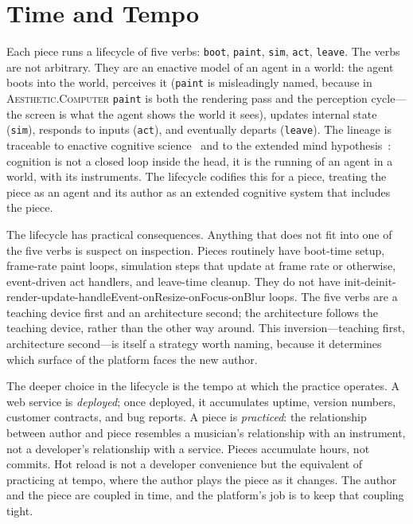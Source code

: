 \documentclass[10pt,letterpaper,twocolumn]{article}
\newcommand{\ac}{\textsc{Aesthetic.Computer}}
\begin{document}
\section{Time and Tempo}

Each piece runs a lifecycle of five verbs: \texttt{boot}, \texttt{paint}, \texttt{sim}, \texttt{act}, \texttt{leave}. The verbs are not arbitrary. They are an enactive model of an agent in a world: the agent boots into the world, perceives it (\texttt{paint} is misleadingly named, because in \ac{} \texttt{paint} is both the rendering pass and the perception cycle---the screen is what the agent shows the world it sees), updates internal state (\texttt{sim}), responds to inputs (\texttt{act}), and eventually departs (\texttt{leave}). The lineage is traceable to enactive cognitive science~\citep{varela1991embodied} and to the extended mind hypothesis~\citep{clark1998extended}: cognition is not a closed loop inside the head, it is the running of an agent in a world, with its instruments. The lifecycle codifies this for a piece, treating the piece as an agent and its author as an extended cognitive system that includes the piece.

The lifecycle has practical consequences. Anything that does not fit into one of the five verbs is suspect on inspection. Pieces routinely have boot-time setup, frame-rate paint loops, simulation steps that update at frame rate or otherwise, event-driven act handlers, and leave-time cleanup. They do not have init-deinit-render-update-handleEvent-onResize-onFocus-onBlur loops. The five verbs are a teaching device first and an architecture second; the architecture follows the teaching device, rather than the other way around. This inversion---teaching first, architecture second---is itself a strategy worth naming, because it determines which surface of the platform faces the new author.

The deeper choice in the lifecycle is the tempo at which the practice operates. A web service is \emph{deployed}; once deployed, it accumulates uptime, version numbers, customer contracts, and bug reports. A piece is \emph{practiced}: the relationship between author and piece resembles a musician's relationship with an instrument, not a developer's relationship with a service. Pieces accumulate hours, not commits. Hot reload is not a developer convenience but the equivalent of practicing at tempo, where the author plays the piece as it changes. The author and the piece are coupled in time, and the platform's job is to keep that coupling tight.
\end{document}
